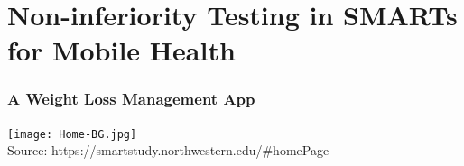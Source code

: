 \documentclass[10pt,xcolor=dvipsnames]{beamer}
\begin{document}
%
%
%


% 
% 
% 
% 
% 

% 

\section{Non-inferiority Testing in SMARTs for Mobile Health}

\begin{frame}
\frametitle{A Weight Loss Management App}
\begin{center}
\texttt{[image: Home-BG.jpg]}\\
\bigskip
Source: {\color{blue}https://smartstudy.northwestern.edu/\#homePage}
\end{center}
\end{frame}
\end{document}
